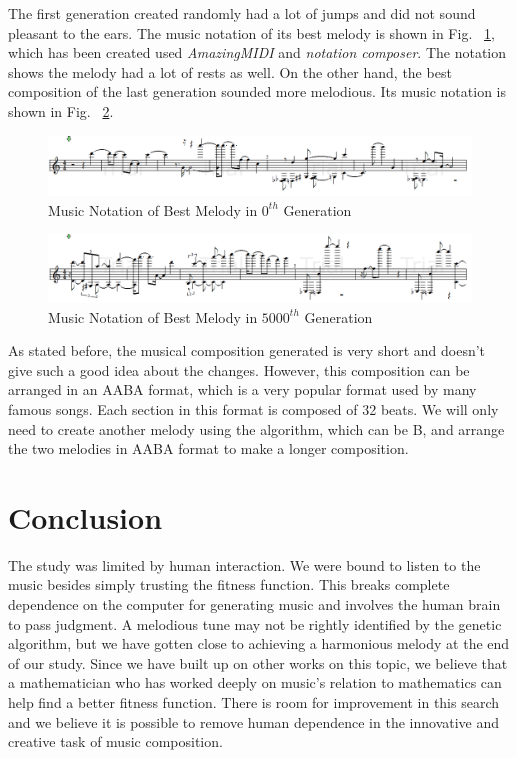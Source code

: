 \documentclass[conference]{IEEEtran}
\begin{document}
The first generation created randomly had a lot of jumps and did not sound pleasant to the ears. The music notation of its best melody is shown in Fig. ~\ref{gen-0}, which has been created used \textit{AmazingMIDI} and \textit{notation composer}. The notation shows the melody had a lot of rests as well. On the other hand, the best composition of the last generation sounded more melodious. Its music notation is shown in Fig. ~\ref{final}.

\begin{figure}
\includegraphics[width=20 cm]{gen-0.png}
\caption{Music Notation of Best Melody in $0^{th}$ Generation}
\label{gen-0}
\end{figure}

\begin{figure}
\includegraphics[width=20 cm]{final.png}
\caption{Music Notation of Best Melody in $5000^{th}$ Generation}
\label{final}
\end{figure}

As stated before, the musical composition generated is very short and doesn't give such a good idea about the changes. However, this composition can be arranged in an AABA format, which is a very popular format used by many famous songs. Each section in this format is composed of 32 beats. We will only need to create another melody using the algorithm, which can be B, and arrange the two melodies in AABA format to make a longer composition.

\section{Conclusion}
The study was limited by human interaction. We were bound to listen to the music besides simply trusting the fitness function. This breaks complete dependence on the computer for generating music and involves the human brain to pass judgment. A melodious tune may not be rightly identified by the genetic algorithm, but we have gotten close to achieving a harmonious melody at the end of our study. Since we have built up on other works on this topic, we believe that a mathematician who has worked deeply on music's relation to mathematics can help find a better fitness function. There is room for improvement in this search and we believe it is possible to remove human dependence in the innovative and creative task of music composition.
\end{document}

